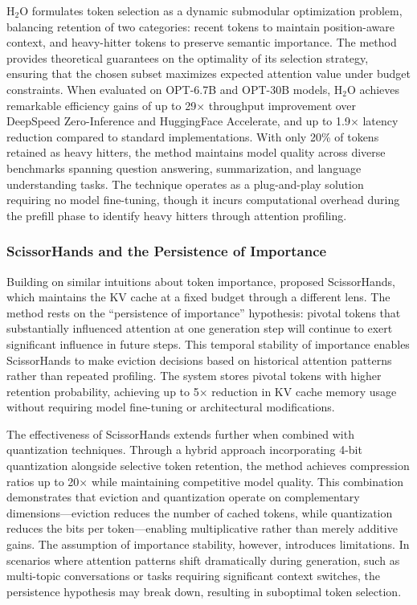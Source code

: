 H$_2$O formulates token selection as a dynamic submodular optimization problem, balancing retention of two categories: recent tokens to maintain position-aware context, and heavy-hitter tokens to preserve semantic importance. The method provides theoretical guarantees on the optimality of its selection strategy, ensuring that the chosen subset maximizes expected attention value under budget constraints. When evaluated on OPT-6.7B and OPT-30B models, H$_2$O achieves remarkable efficiency gains of up to 29$\times$ throughput improvement over DeepSpeed Zero-Inference and HuggingFace Accelerate, and up to 1.9$\times$ latency reduction compared to standard implementations. With only 20\% of tokens retained as heavy hitters, the method maintains model quality across diverse benchmarks spanning question answering, summarization, and language understanding tasks. The technique operates as a plug-and-play solution requiring no model fine-tuning, though it incurs computational overhead during the prefill phase to identify heavy hitters through attention profiling.

\subsubsection{ScissorHands and the Persistence of Importance}

Building on similar intuitions about token importance, \citet{liu2023scissorhands} proposed ScissorHands, which maintains the KV cache at a fixed budget through a different lens. The method rests on the ``persistence of importance'' hypothesis: pivotal tokens that substantially influenced attention at one generation step will continue to exert significant influence in future steps. This temporal stability of importance enables ScissorHands to make eviction decisions based on historical attention patterns rather than repeated profiling. The system stores pivotal tokens with higher retention probability, achieving up to 5$\times$ reduction in KV cache memory usage without requiring model fine-tuning or architectural modifications.

The effectiveness of ScissorHands extends further when combined with quantization techniques. Through a hybrid approach incorporating 4-bit quantization alongside selective token retention, the method achieves compression ratios up to 20$\times$ while maintaining competitive model quality. This combination demonstrates that eviction and quantization operate on complementary dimensions---eviction reduces the number of cached tokens, while quantization reduces the bits per token---enabling multiplicative rather than merely additive gains. The assumption of importance stability, however, introduces limitations. In scenarios where attention patterns shift dramatically during generation, such as multi-topic conversations or tasks requiring significant context switches, the persistence hypothesis may break down, resulting in suboptimal token selection.

